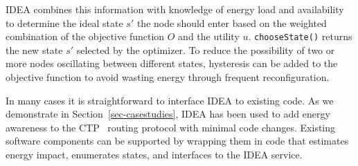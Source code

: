 IDEA combines this information with knowledge of energy load and availability
to determine the ideal state $s'$ the node should enter based on the weighted
combination of the objective function $O$ and the utility $u$.
\texttt{chooseState()} returns the new state $s'$ selected by the optimizer.
To reduce the possibility of two or more nodes oscillating between different
states, hysteresis can be added to the objective function to avoid wasting
energy through frequent reconfiguration.

In many cases it is straightforward to interface IDEA to existing code. As we
demonstrate in Section~\ref{sec-casestudies}, IDEA has been used to add
energy awareness to the CTP~\cite{ctp-sensys09} routing protocol with minimal
code changes. Existing software components can be supported by wrapping them
in code that estimates energy impact, enumerates states, and interfaces to
the IDEA service.
